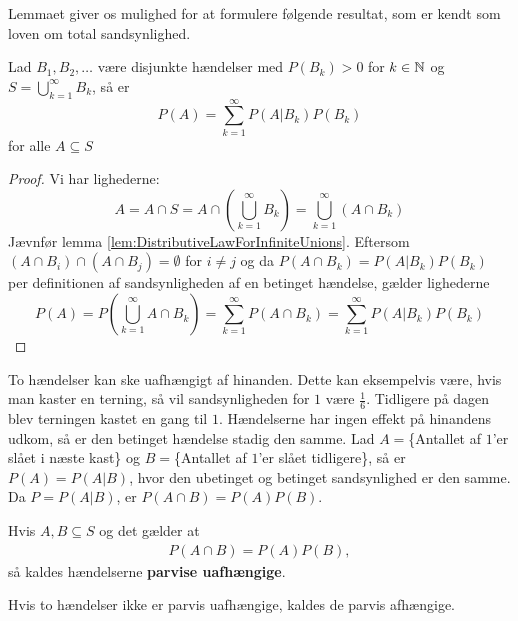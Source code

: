 Lemmaet giver os mulighed for at formulere følgende resultat, som er kendt som loven om total sandsynlighed.
\begin{thm} \label{thm:LPT}
Lad $B_1, B_2, \ldots$ være disjunkte hændelser med $P(B_k) > 0$ for $k \in \mathbb{N}$ og $S = \bigcup^\infty_{k = 1} B_k$, så er
\begin{equation*}
    P(A) = \sum^\infty_{k = 1} P(A | B_k)P(B_k)
\end{equation*}
for alle $A \subseteq S$
\end{thm}
\begin{proof}
Vi har lighederne:
\begin{equation*}
    A = A \cap S = A \cap \left( \bigcup^\infty_{k = 1} B_k \right) = \bigcup^\infty_{k = 1} (A \cap B_k)
\end{equation*}
Jævnfør lemma \ref{lem:DistributiveLawForInfiniteUnions}. Eftersom $(A \cap B_i) \cap (A \cap B_j) = \emptyset$ for $i \neq j$ og da $P(A \cap B_k) = P(A | B_k) P(B_k)$ per definitionen af sandsynligheden af en betinget hændelse, gælder lighederne
\begin{equation*}
    P(A) = P\left( \bigcup^\infty_{k = 1} A \cap B_k\right)= \sum^\infty_{k = 1} P(A \cap B_k) = \sum^\infty_{k = 1} P(A | B_k)P(B_k)
\end{equation*}
\end{proof}

To hændelser kan ske uafhængigt af hinanden. Dette kan eksempelvis være, hvis man kaster en terning, så vil sandsynligheden for $1$ være $\frac{1}{6}$. Tidligere på dagen blev terningen kastet en gang til $1$. Hændelserne har ingen effekt på hinandens udkom, så er den betinget hændelse stadig den samme. Lad $A=$\{Antallet af $1$'er slået i næste kast\} og $B=$\{Antallet af $1$'er slået tidligere\}, så er $P(A)=P(A|B)$, hvor den ubetinget og betinget sandsynlighed er den samme.  Da $P=P(A|B)$, er  $P(A\cap B)=P(A)P(B)$. 
\begin{defn} \label{Def:def1.5} %
Hvis $A, B \subseteq S$ og det gælder at
\begin{align*}
    P(A\cap B)=P(A)P(B),
\end{align*}
så kaldes hændelserne \textbf{parvise uafhængige}.
\end{defn}
Hvis to hændelser ikke er parvis uafhængige, kaldes de parvis afhængige.

